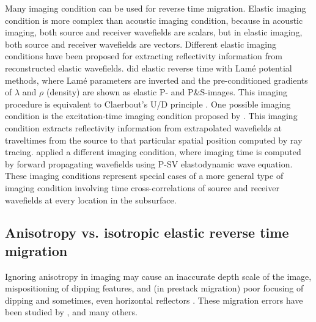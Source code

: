 Many imaging condition can be used for reverse time migration. 
Elastic imaging condition is more complex than acoustic imaging condition, because in acoustic imaging, both source and receiver wavefields are scalars, but in elastic imaging, both source and receiver wavefields are vectors.
Different elastic imaging conditions have been proposed for extracting reflectivity information from reconstructed elastic wavefields. 
\cite{GEO63-05-16851695} did elastic reverse time with Lam\'e potential methods, where Lam\'e parameters are inverted and the pre-conditioned gradients of $\lambda$ and $\rho$ (density) are shown as elastic P- and P\&S-images. This imaging procedure is equivalent to Claerbout's U/D principle \cite[]{GEO36-03-04670481}.
One possible imaging condition is the excitation-time imaging condition proposed by \cite{chang:67}.  This imaging condition extracts reflectivity information from extrapolated wavefields at traveltimes from the source to that particular spatial position computed by ray tracing.
\cite{SEG-1991-1009} applied a different imaging condition, where imaging time is computed by forward propagating wavefields using P-SV elastodynamic wave equation. 
These imaging conditions represent special cases of a more general type of imaging condition involving time cross-correlations of source and receiver wavefields at every location in the subsurface.







\subsection{Anisotropy vs. isotropic elastic reverse time migration}

Ignoring anisotropy in imaging may cause an inaccurate depth scale of the image, mispositioning of dipping features, and (in prestack migration) poor focusing of dipping and sometimes, even horizontal reflectors \cite[]{tsvankin.2001}. These migration errors have been studied by \cite{larner:1454}, \cite{alkhalifah:1405} and many others. 


